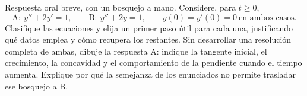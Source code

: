 Respuesta oral breve, con un bosquejo a mano. Considere, para \(t\ge0\),
\[
\mathrm A:\ y''+2y'=1,
\qquad
\mathrm B:\ y''+2y=1,
\qquad y(0)=y'(0)=0\ \text{en ambos casos}.
\]
Clasifique las ecuaciones y elija un primer paso útil para cada una, justificando qué datos emplea y cómo recupera los restantes. Sin desarrollar una resolución completa de ambas, dibuje la respuesta A: indique la tangente inicial, el crecimiento, la concavidad y el comportamiento de la pendiente cuando el tiempo aumenta. Explique por qué la semejanza de los enunciados no permite trasladar ese bosquejo a B.
